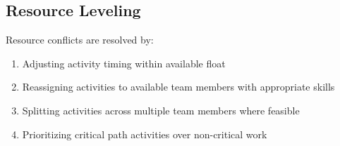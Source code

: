 \subsection{Resource Leveling}

Resource conflicts are resolved by:

\begin{enumerate}
    \item Adjusting activity timing within available float
    \item Reassigning activities to available team members with appropriate skills
    \item Splitting activities across multiple team members where feasible
    \item Prioritizing critical path activities over non-critical work
\end{enumerate}
